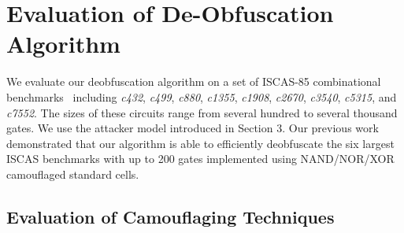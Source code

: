 \documentclass[proposal]{umassthesis}  %
\begin{document}
\chapter{Evaluation of De-Obfuscation Algorithm}
We evaluate our deobfuscation algorithm on a set of ISCAS-85 combinational benchmarks~\cite{hansen-99} including \textit{c432}, \textit{c499},  \textit{c880}, \textit{c1355}, \textit{c1908}, \textit{c2670}, \textit{c3540},  \textit{c5315}, and \textit{c7552}. The sizes of these circuits range from several hundred to several thousand gates. We use the attacker model introduced in Section 3. Our previous work~\cite{duo-date16} demonstrated that our algorithm is able to efficiently deobfuscate the six largest ISCAS benchmarks with up to 200 gates implemented using NAND/NOR/XOR camouflaged standard cells. %








\section{Evaluation of Camouflaging Techniques}
\end{document}

